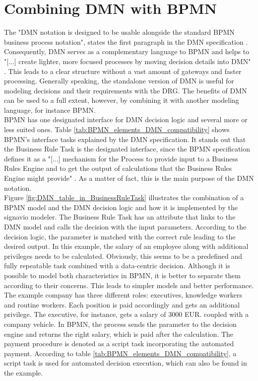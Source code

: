 \section{Combining DMN with BPMN}
The "DMN notation is designed to be usable alongside the standard BPMN business process notation", states the first paragraph in the DMN specification \cite{DMNspec2016}. Consequently, DMN serves as a complementary language to BPMN and helps to "[...] create lighter, more focused processes by moving decision details into DMN" \cite{DMNmicroguide}. This leads to a clear structure without a vast amount of gateways and faster processing. Generally speaking, the standalone version of DMN is useful for modeling decisions and their requirements with the \ac{DRG}. The benefits of DMN can be used to a full extent, however, by combining it with another modeling language, for instance BPMN. \\
BPMN has one designated interface for DMN decision logic and several more or less suited ones. Table \ref{tab:BPMN_elements_DMN_compatibility} shows BPMN's interface tasks explained by the DMN specification. It stands out that the Business Rule Task is the designated interface, since the BPMN specification defines it as a "[...] mechanism for the Process to provide input to a Business Rules Engine and to get the output of calculations that the Business Rules Engine might provide" \cite{BPMNspec}. As a matter of fact, this is the main purpose of the DMN notation. \\
Figure \ref{fig:DMN_table_in_BusinessRuleTask} illustrates the combination of a BPMN model and the DMN decision logic and how it is implemented by the signavio modeler. The Business Rule Task has an attribute that links to the DMN model and calls the decision with the input parameters. According to the decision logic, the parameter is matched with the correct rule leading to the desired output. In this example, the salary of an employee along with additional privileges needs to be calculated. Obviously, this seems to be a predefined and fully repeatable task combined with a data-centric decision. Although it is possible to model both characteristics in BPMN, it is better to separate them according to their concerns. This leads to simpler models and better performance. \\
The example company has three different roles: executives, knowledge workers and routine workers. Each position is paid accordingly and gets an additional privilege. The executive, for instance, gets a salary of 3000 EUR. coupled with a company vehicle. In BPMN, the process sends the parameter to the decision engine and returns the right salary, which is paid after the calculation. The payment procedure is denoted as a script task incorporating the automated payment. According to table \ref{tab:BPMN_elements_DMN_compatibility}, a script task is used for automated decision execution, which can also be found in the example. \\
